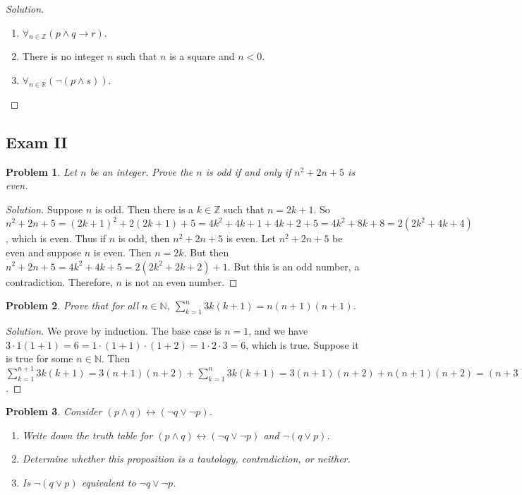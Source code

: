 \documentclass[oneside]{book}
\theoremstyle{mystyle}
\newtheorem{problem}{Problem}[section]
\begin{document}
\begin{proof}[Solution]
\
\begin{enumerate}
    \item $\forall_{n\in \mathbb{Z}}(p\land q \rightarrow r)$.
    \item There is no integer $n$ such that $n$ is a square and $n<0$.
    \item $\forall_{n\in \mathbb{R}}(\neg(p\land s))$.
\end{enumerate}
\end{proof}
\subsection{Exam II}
\begin{problem}
Let $n$ be an integer. Prove the $n$ is odd if and only if $n^2+2n+5$ is even.
\end{problem}
\begin{proof}[Solution]
Suppose $n$ is odd. Then there is a $k\in \mathbb{Z}$ such that $n = 2k+1$. So $n^2+2n+5 = (2k+1)^2+2(2k+1)+5 = 4k^2+4k+1+4k+2+5 = 4k^2+8k+8 = 2(2k^2+4k+4)$, which is even. Thus if $n$ is odd, then $n^2+2n+5$ is even. Let $n^2+2n+5$ be even and suppose $n$ is even. Then $n = 2k$. But then $n^2+2n+5 = 4k^2+4k+5 = 2(2k^2+2k+2)+1$. But this is an odd number, a contradiction. Therefore, $n$ is not an even number.
\end{proof}
\begin{problem}
Prove that for all $n\in \mathbb{N}$, $\sum_{k=1}^{n} 3k(k+1) = n(n+1)(n+1)$.
\end{problem}
\begin{proof}[Solution]
We prove by induction. The base case is $n=1$, and we have $3\cdot 1(1+1) = 6 = 1\cdot(1+1)\cdot(1+2) = 1\cdot 2 \cdot 3 = 6$, which is true. Suppose it is true for some $n\in \mathbb{N}$. Then $\sum_{k=1}^{n+1} 3k(k+1) = 3(n+1)(n+2) +\sum_{k=1}^{n} 3k(k+1) = 3(n+1)(n+2) +n(n+1)(n+2) = (n+3)(n+1)(n+2) = (n+1)\big((n+1)+1\big)\big((n+1)+2\big)$.
\end{proof}
\begin{problem}
\label{problem:discrete_structures_exam_2_p_and_q_iff_not_p_or_not_q}
Consider $(p\land q) \leftrightarrow (\neg q \lor \neg p)$.
\begin{enumerate}
    \item Write down the truth table for $(p\land q)\leftrightarrow (\neg q \lor \neg p)$ and $\neg(q\lor p)$.
    \item Determine whether this proposition is a tautology, contradiction, or neither.
    \item Is $\neg(q\lor p)$ equivalent to $\neg q \lor \neg p$.
\end{enumerate}
\end{problem}
\end{document}
